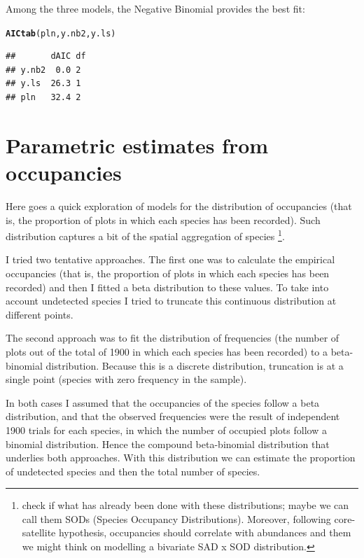 \documentclass[12pt, A4]{article}\usepackage[]{graphicx}\usepackage[]{color}
\makeatletter
\newcommand{\hlstd}[1]{\textcolor[rgb]{0.345,0.345,0.345}{#1}}%
\newcommand{\hlkwd}[1]{\textcolor[rgb]{0.737,0.353,0.396}{\textbf{#1}}}%
\newenvironment{kframe}{%
 \def\at@end@of@kframe{}%
 \ifinner\ifhmode%
  \def\at@end@of@kframe{\end{minipage}}%
  \begin{minipage}{\columnwidth}%
 \fi\fi%
 \def\FrameCommand##1{\hskip\@totalleftmargin \hskip-\fboxsep
 \colorbox{shadecolor}{##1}\hskip-\fboxsep
     \hskip-\linewidth \hskip-\@totalleftmargin \hskip\columnwidth}%
 \MakeFramed {\advance\hsize-\width
   \@totalleftmargin\z@ \linewidth\hsize
   \@setminipage}}%
 {\par\unskip\endMakeFramed%
 \at@end@of@kframe}
\newenvironment{knitrout}{}{} %
\makeatother
\begin{document}
Among the three models, the Negative Binomial
provides the best fit:

 
\begin{knitrout}
\color{fgcolor}\begin{kframe}
\begin{alltt}
\hlkwd{AICtab}\hlstd{(pln, y.nb2, y.ls)}
\end{alltt}
\begin{verbatim}
##       dAIC df
## y.nb2  0.0 2 
## y.ls  26.3 1 
## pln   32.4 2
\end{verbatim}
\end{kframe}
\end{knitrout}

\section*{Parametric estimates from occupancies}

Here goes a quick exploration of models for the distribution of
occupancies (that is, the proportion of plots in which each species
has been recorded). Such distribution captures a bit of
the spatial aggregation of species \footnote{check if what has already been done with these distributions; maybe we can call them SODs (Species Occupancy Distributions). Moreover, following core-satellite hypothesis, occupancies should correlate with abundances and them we might think on modelling a bivariate SAD x SOD distribution.}. 

I tried two tentative approaches.
The first one was to calculate the empirical occupancies (that is, the proportion
of plots in which each species has been recorded) and then I fitted
a beta distribution to these values. 
To take into account undetected species I tried to truncate this
continuous distribution at different points.

The second approach was to fit the distribution
of frequencies (the number of plots out of the total of 1900
in which each species has been recorded) to
a beta-binomial distribution. Because this is a discrete distribution, 
truncation is at a single point (species with zero frequency in the sample).

In both cases I assumed that the occupancies of the species
follow a beta distribution, and that the observed frequencies were
the result of independent 1900 trials for each species, in which
the number of occupied plots follow a binomial distribution. 
Hence the compound beta-binomial distribution that underlies both approaches.
With this distribution we can estimate the proportion of undetected species
and then the total number of species.
\end{document}
